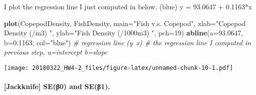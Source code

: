 \documentclass[]{article}
\newenvironment{Shaded}{\begin{snugshade}}{\end{snugshade}}
\newcommand{\KeywordTok}[1]{\textcolor[rgb]{0.13,0.29,0.53}{\textbf{{#1}}}}
\newcommand{\DataTypeTok}[1]{\textcolor[rgb]{0.13,0.29,0.53}{{#1}}}
\newcommand{\DecValTok}[1]{\textcolor[rgb]{0.00,0.00,0.81}{{#1}}}
\newcommand{\FloatTok}[1]{\textcolor[rgb]{0.00,0.00,0.81}{{#1}}}
\newcommand{\StringTok}[1]{\textcolor[rgb]{0.31,0.60,0.02}{{#1}}}
\newcommand{\CommentTok}[1]{\textcolor[rgb]{0.56,0.35,0.01}{\textit{{#1}}}}
\newcommand{\NormalTok}[1]{{#1}}
\let\oldparagraph\paragraph
\renewcommand{\paragraph}[1]{\oldparagraph{#1}\mbox{}}
\begin{document}
I plot the regression line I just computed in below. (blue) y = 93.0647
+ 0.1163*x

\begin{Shaded}
\begin{Highlighting}[]
\KeywordTok{plot}\NormalTok{(CopepodDensity, FishDensity, }\DataTypeTok{main=}\StringTok{"Fish v.s. Copepod"}\NormalTok{, }
    \DataTypeTok{xlab=}\StringTok{"Copepod Density (/m3) "}\NormalTok{, }\DataTypeTok{ylab=}\StringTok{"Fish Density (/1000m3) "}\NormalTok{, }\DataTypeTok{pch=}\DecValTok{19}\NormalTok{)}
\KeywordTok{abline}\NormalTok{(}\DataTypeTok{a=}\FloatTok{93.0647}\NormalTok{, }\DataTypeTok{b=}\FloatTok{0.1163}\NormalTok{, }\DataTypeTok{col=}\StringTok{"blue"}\NormalTok{) }\CommentTok{# regression line (y~x) # the regression line I computed in previous step, a=intercept b=slope}
\end{Highlighting}
\end{Shaded}

\texttt{[image: 20180322\_HW4-2\_files/figure-latex/unnamed-chunk-10-1.pdf]}

\paragraph{{[}Jackknife{]} SE(β0) and
SE(β1).}\label{jackknife-se0-and-se1.}
\end{document}
